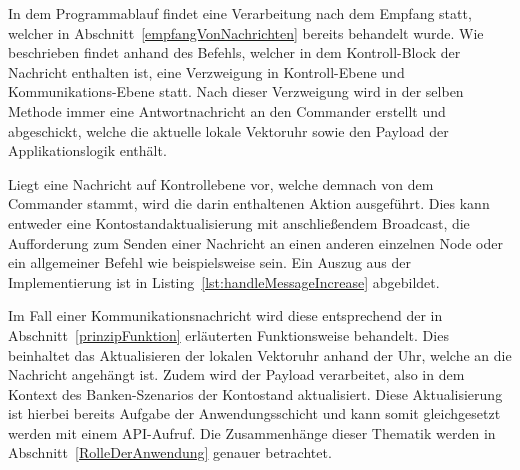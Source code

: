 In dem Programmablauf findet eine Verarbeitung nach dem Empfang statt, welcher in Abschnitt~\ref{empfangVonNachrichten} bereits behandelt wurde. Wie beschrieben findet anhand des Befehls, welcher in dem Kontroll-Block der Nachricht enthalten ist, eine Verzweigung in Kontroll-Ebene und Kommunikations-Ebene statt. Nach dieser Verzweigung wird in der selben Methode immer eine Antwortnachricht an den Commander erstellt und abgeschickt, welche die aktuelle lokale Vektoruhr sowie den Payload der Applikationslogik enthält.

Liegt eine Nachricht auf Kontrollebene vor, welche demnach von dem Commander stammt, wird die darin enthaltenen Aktion ausgeführt. Dies kann entweder eine Kontostandaktualisierung mit anschließendem Broadcast, die Aufforderung zum Senden einer Nachricht an einen anderen einzelnen Node oder ein allgemeiner Befehl wie beispielsweise  sein. Ein Auszug aus der Implementierung ist in Listing~\ref{lst:handleMessageIncrease} abgebildet.

Im Fall einer Kommunikationsnachricht wird diese entsprechend der in Abschnitt~\ref{prinzipFunktion} erläuterten Funktionsweise behandelt. Dies beinhaltet das Aktualisieren der lokalen Vektoruhr anhand der Uhr, welche an die Nachricht angehängt ist. Zudem wird der Payload verarbeitet, also in dem Kontext des Banken-Szenarios der Kontostand aktualisiert. Diese Aktualisierung ist hierbei bereits Aufgabe der Anwendungsschicht und kann somit gleichgesetzt werden mit einem API-Aufruf. Die Zusammenhänge dieser Thematik werden in Abschnitt~\ref{RolleDerAnwendung} genauer betrachtet.


